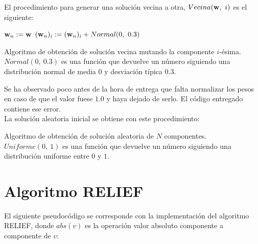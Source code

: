 \documentclass{article}
\newenvironment{algo}{
	\vspace*{0.5cm}
	\begin{algorithm}[H]}{
	\end{algorithm}
	\vspace*{0.5cm}
}
\begin{document}
El procedimiento para generar una solución vecina a otra, $Vecina(\normalfont \textbf w,\ i)$ es el siguiente:

\begin{algo}
	
	$\normalfont \textbf w_n := \normalfont \textbf w$\;
	$(\normalfont \textbf w_n)_i := (\normalfont \textbf w_n)_i + Normal(0,\ 0.3)$\;
	\vspace{0.2cm}
	\caption{Algoritmo de obtención de solución vecina mutando la componente $i$-ésima. $Normal(0,\ 0.3)$ es una función que devuelve un número siguiendo una distribución normal de media $0$ y desviación típica $0.3$.}
\end{algo}

Se ha observado poco antes de la hora de entrega que falta normalizar los pesos en caso de que el valor fuese $1.0$ y haya dejado de serlo. El código entregado contiene ese error. \\

La solución aleatoria inicial se obtiene con este procedimiento:

\begin{algo}
	\vspace{0.2cm}
	\caption{Algoritmo de obtención de solución aleatoria de $N$ componentes. $Uniforme(0,\ 1)$ es una función que devuelve un número siguiendo una distribución uniforme entre $0$ y $1$.}
\end{algo}

\section{Algoritmo RELIEF}

El siguiente pseudocódigo se corresponde con la implementación del algoritmo RELIEF, donde $abs(v)$ es la operación valor absoluto componente a componente de $v$:
\end{document}
